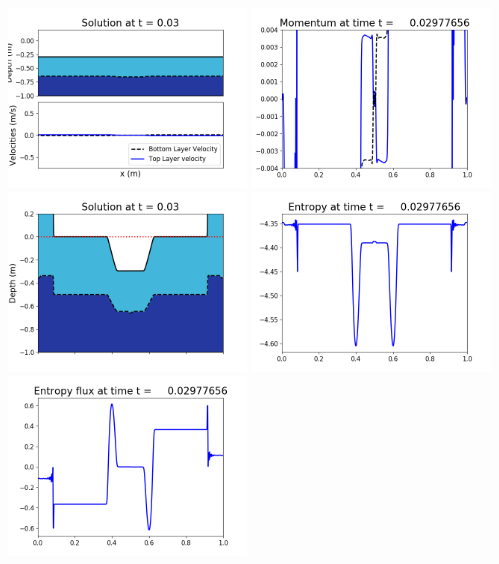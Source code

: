 \documentclass[11pt]{article}
\begin{document}
\includegraphics[width=0.475\textwidth]{frame0069fig1002.png}
\vskip 10pt 
\includegraphics[width=0.475\textwidth]{frame0069fig1003.png}
\includegraphics[width=0.475\textwidth]{frame0069fig1006.png}
\vskip 10pt 
\includegraphics[width=0.475\textwidth]{frame0069fig1007.png}
\includegraphics[width=0.475\textwidth]{frame0069fig1008.png}
\end{document}
